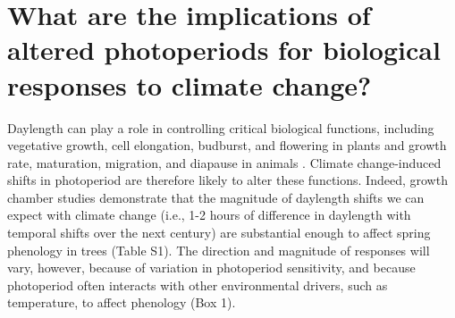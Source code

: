 \documentclass{article}
\begin{document}
\section*{What are the implications of altered photoperiods for biological responses to climate change?}
\par Daylength can play a role in controlling critical biological functions, including vegetative growth, cell elongation, budburst, and flowering in plants \citep{Linkosalo:2006aa,erwin1998,sidaway2010,Hsu:2011,Heide:2011aa,Ashby:1962aa,Heide:2012aa,mimura2007} and growth rate, maturation, migration, and diapause in animals \citep{muir1994,bradshaw2006,saunders1970,tobin2008,zydlewski2014}. Climate change-induced shifts in photoperiod are therefore likely to alter these functions. 
Indeed, growth chamber studies demonstrate that the magnitude of daylength shifts we can expect with climate change (i.e., 1-2 hours of difference in daylength with temporal shifts over the next century) are substantial enough to affect spring phenology in trees (Table S1). The direction and magnitude of responses will vary, however, because of variation in photoperiod sensitivity, and because photoperiod often interacts with other environmental drivers, such as temperature, to affect phenology (Box 1). 
\end{document}
